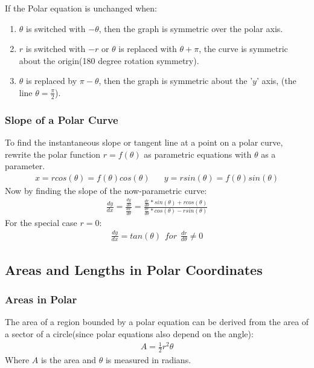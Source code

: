 \documentclass{article}
\begin{document}
If the Polar equation is unchanged when:
\begin{enumerate}
    \item $\theta$ is switched with $-\theta$, then the graph is symmetric over the polar axis.
    \item $r$ is switched with $-r$ or $\theta$ is replaced with $\theta + \pi$, the curve is symmetric about the origin(180 degree rotation symmetry).
    \item $\theta$ is replaced by $\pi - \theta$, then the graph is symmetric about the '$y$' axis, (the line $\theta = \frac{\pi}{2}$).
\end{enumerate}
\subsubsection{Slope of a Polar Curve}
To find the instantaneous slope or tangent line at a point on a polar curve, rewrite the polar function $r=f(\theta)$ as parametric equations with $\theta$ as a parameter.
\begin{gather*}
    x = r cos(\theta) = f(\theta)cos(\theta)\hspace{20pt}y = r sin(\theta) = f(\theta)sin(\theta)
\end{gather*}
Now by finding the slope of the now-parametric curve:
\begin{gather*}
    \frac{dy}{dx} = \frac{\frac{dy}{d\theta}}{\frac{dx}{d\theta}}
    = \frac{\frac{dr}{d\theta}*sin(\theta) + r cos(\theta)}{\frac{dr}{d\theta}*cos(\theta) - rsin(\theta)}
\end{gather*}
For the special case $r=0$:
\begin{gather*}
    \frac{dy}{dx} = tan(\theta) \hspace{5pt} for \hspace{5pt} \frac{dr}{d\theta} \neq 0
\end{gather*}
\subsection{Areas and Lengths in Polar Coordinates}
\subsubsection{Areas in Polar}
The area of a region bounded by a polar equation can be derived from the area of a sector of a circle(since polar equations also depend on the angle):
\begin{gather*}
    A = \frac{1}{2}r^2\theta
\end{gather*}
Where $A$ is the area and $\theta$ is measured in radians.
\end{document}
